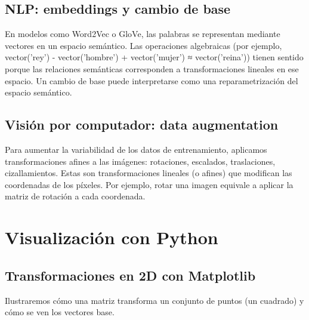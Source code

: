 \documentclass[12pt,a4paper,openany,oneside]{book}
\begin{document}
\begin{center}
\end{center}

\subsection{NLP: embeddings y cambio de base}
En modelos como Word2Vec o GloVe, las palabras se representan mediante vectores en un espacio semántico. Las operaciones algebraicas (por ejemplo, vector('rey') - vector('hombre') + vector('mujer') ≈ vector('reina')) tienen sentido porque las relaciones semánticas corresponden a transformaciones lineales en ese espacio. Un cambio de base puede interpretarse como una reparametrización del espacio semántico.

\subsection{Visión por computador: data augmentation}
Para aumentar la variabilidad de los datos de entrenamiento, aplicamos transformaciones afines a las imágenes: rotaciones, escalados, traslaciones, cizallamientos. Estas son transformaciones lineales (o afines) que modifican las coordenadas de los píxeles. Por ejemplo, rotar una imagen equivale a aplicar la matriz de rotación a cada coordenada.

\section{Visualización con Python}

\subsection{Transformaciones en 2D con Matplotlib}
Ilustraremos cómo una matriz transforma un conjunto de puntos (un cuadrado) y cómo se ven los vectores base.
\end{document}
